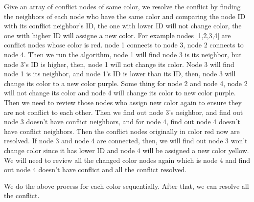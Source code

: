 \documentclass[12pt] {article}
\begin{document}
Give an array of conflict nodes of same color, we resolve the conflict by finding the neighbors of each node who have the same color and comparing the node ID with its conflict neighbor's ID, the one with lower ID will not change color, the one with higher ID will assigne a new color. For example nodes [1,2,3,4] are conflict nodes whose color is red. node 1 connects to node 3, node 2 connects to node 4. Then we run the algorithm, node 1 will find node 3 is its neighbor, but node 3's ID is higher, then, node 1 will not change its color. Node 3 will find node 1 is its neighbor, and node 1's ID is lower than its ID, then, node 3 will change its color to a new color purple. Some thing for node 2 and node 4, node 2 will not change its color and node 4 will change its color to new color purple. Then we need to review those nodes who assign new color again to ensure they are not conflict to each other. Then we find out node 3's neighbor, and find out node 3 doesn't have conflict neighbors, and for node 4, find out node 4 doesn't have conflict neighbors. Then the conflict nodes originally in color red now are resolved. If node 3 and node 4 are connected, then, we will find out node 3 won't change color since it has lower ID and node 4 will be assigned a new color yellow. We will need to review all the changed color nodes again which is node 4 and find out node 4 doesn't have conflict and all the conflict resolved. 

We do the above process for each color sequentially. After that, we can resolve all the conflict. 
\end{document}
